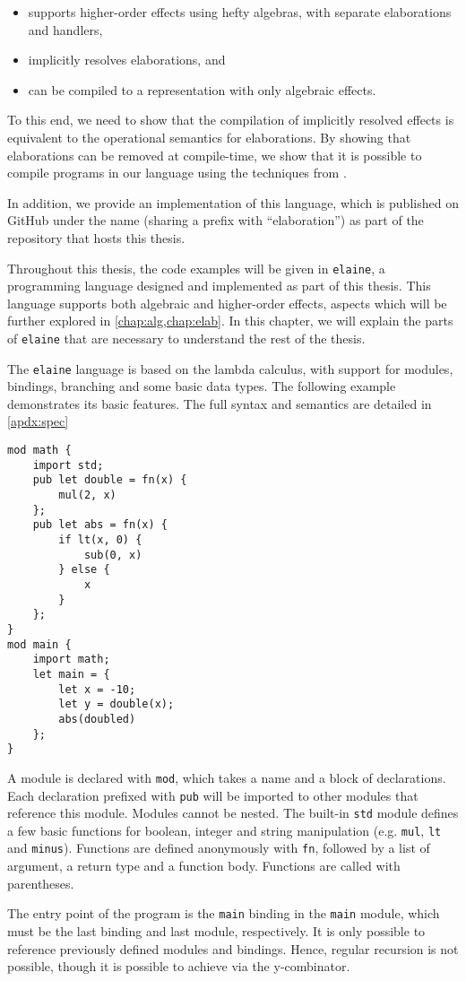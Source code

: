 \begin{itemize}
    \item supports higher-order effects using hefty algebras, with separate elaborations and handlers,
    \item implicitly resolves elaborations, and
    \item can be compiled to a representation with only algebraic effects.
\end{itemize}

To this end, we need to show that the compilation of implicitly resolved effects is equivalent to the operational semantics for elaborations. By showing that elaborations can be removed at compile-time, we show that it is possible to compile programs in our language using the techniques from \cite{leijen_type_2017}.

In addition, we provide an implementation of this language, which is published on GitHub under the name  (sharing a prefix with ``elaboration'') as part  of the repository that hosts this thesis.

Throughout this thesis, the code examples will be given in \texttt{elaine}, a programming language designed and implemented as part of this thesis. This language supports both algebraic and higher-order effects, aspects which will be further explored in \cref{chap:alg,chap:elab}. In this chapter, we will explain the parts of \texttt{elaine} that are necessary to understand the rest of the thesis.

The \texttt{elaine} language is based on the lambda calculus, with support for modules, bindings, branching and some basic data types. The following example demonstrates its basic features. The full syntax and semantics are detailed in \cref{apdx:spec}

\begin{lstlisting}[style=fancy]
mod math {
    import std;
    pub let double = fn(x) {
        mul(2, x)
    };
    pub let abs = fn(x) {
        if lt(x, 0) {
            sub(0, x)
        } else {
            x
        }
    };
}
mod main {
    import math;
    let main = {
        let x = -10;
        let y = double(x);
        abs(doubled)
    };
}
\end{lstlisting}

A module is declared with \lstinline{mod}, which takes a name and a block of declarations. Each declaration prefixed with \lstinline{pub} will be imported to other modules that reference this module. Modules cannot be nested. The built-in \lstinline{std} module defines a few basic functions for boolean, integer and string manipulation (e.g. \lstinline{mul}, \lstinline{lt} and \lstinline{minus}). Functions are defined anonymously with \lstinline{fn}, followed by a list of argument, a return type and a function body. Functions are called with parentheses.

The entry point of the program is the \lstinline{main} binding in the \lstinline{main} module, which must be the last binding and last module, respectively. It is only possible to reference previously defined modules and bindings. Hence, regular recursion is not possible, though it is possible to achieve via the y-combinator.
